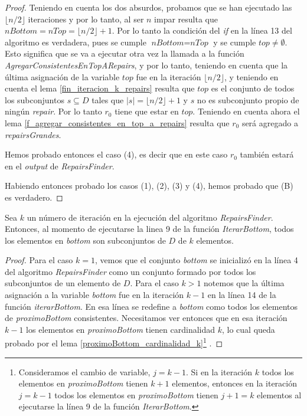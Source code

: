 \documentclass[11pt,a4paper,twoside]{tesis}
\newcommand{\parteEntera}{\lfloor n/2 \rfloor}
\begin{document}
\begin{proof}
Teniendo en cuenta los dos absurdos, probamos que se han ejecutado las $\parteEntera$ iteraciones y por lo tanto, al ser $n$ impar resulta que $\textit{nBottom} = \textit{nTop} = \parteEntera + 1$. Por lo tanto la condición del \textit{if} en la línea 13 del algoritmo es verdadera, pues se cumple $\textit{nBottom} = \textit{nTop}$ y se cumple $\textit{top} \neq \emptyset$. Esto significa que se va a ejecutar otra vez la llamada a la función \textit{AgregarConsistentesEnTopARepairs}, y por lo tanto, teniendo en cuenta que la última asignación de la variable $\textit{top}$ fue en la iteración $\parteEntera$, y teniendo en cuenta el lema \ref{fin_iteracion_k_repairs} resulta que $\textit{top}$ es el conjunto de todos los subconjuntos $s \subseteq D$ tales que $|s| = \parteEntera + 1$ y $s$ no es subconjunto propio de ningún \textit{repair}. Por lo tanto $r_0$ tiene que estar en $\textit{top}$. Teniendo en cuenta ahora el lema \ref{f_agregar_consistentes_en_top_a_repairs} resulta que $r_0$ será agregado a \textit{repairsGrandes}.

Hemos probado entonces el caso (4), es decir que en este caso $r_0$ también estará en el \textit{output} de \textit{RepairsFinder}.

Habiendo entonces probado los casos (1), (2), (3) y (4), hemos probado que (B) es verdadero.
\end{proof}

\begin{lemma}\label{bottom_cardinalidad_k}
Sea $k$ un número de iteración en la ejecución del algoritmo \textit{RepairsFinder}. Entonces, al momento de ejecutarse la linea 9 de la función \textit{IterarBottom}, todos los elementos en \textit{bottom} son subconjuntos de $D$ de $k$ elementos.
\end{lemma}

\begin{proof}
Para el caso $k = 1$, vemos que el conjunto \textit{bottom} se inicializó en la línea 4 del algoritmo \textit{RepairsFinder} como un conjunto formado por todos los subconjuntos de un elemento de $D$. Para el caso $k>1$ notemos que la última asignación a la variable \textit{bottom} fue en la iteración $k-1$ en la línea 14 de la función \textit{iterarBottom}. En esa línea se redefine a \textit{bottom} como todos los elementos de \textit{proximoBottom} consistentes. Necesitamos ver entonces que en esa iteración $k-1$ los elementos en \textit{proximoBottom} tienen cardinalidad $k$, lo cual queda probado por el lema \ref{proximoBottom_cardinalidad_k}\footnote{Consideramos el cambio de variable, $j = k-1$. Si en la iteración $k$ todos los elementos en \textit{proximoBottom} tienen $k+1$ elementos, entonces en la iteración $j = k-1$ todos los elementos en \textit{proximoBottom} tienen $j + 1 = k$ elementos al ejecutarse la línea 9 de la función \textit{IterarBottom}.} .
\end{proof}
\end{document}
